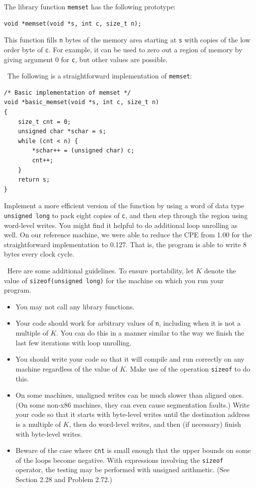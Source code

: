 \documentclass[12pt]{article}
\newenvironment{ex}[2][Exercise]{\begin{trivlist}
		\item[\hskip \labelsep {\bfseries #1}\hskip \labelsep {\bfseries #2.}]}{\end{trivlist}}
\begin{document}
\begin{ex}{5.17}
	The library function \texttt{memset} has the following prototype:
	\begin{lstlisting}
void *memset(void *s, int c, size_t n);
	\end{lstlisting}
	This function fills \texttt{n} bytes of the memory area starting at \texttt{s} with
	copies of the low order byte of \texttt{c}. For example, it can be used to zero out
	a region of memory by giving argument 0 for \texttt{c}, but other values are possible.
	
	\
	The following is a straightforward implementation of \texttt{memset}:
	\begin{lstlisting}
/* Basic implementation of memset */
void *basic_memset(void *s, int c, size_t n)
{
	size_t cnt = 0;
	unsigned char *schar = s;
	while (cnt < n) {
		*schar++ = (unsigned char) c;
		cnt++;
	}
	return s;
}
	\end{lstlisting}
	Implement a more efficient version of the function by using a word of data type
	\texttt{unsigned long} to pack eight copies of \texttt{c}, and then step through
	the region using word-level writes. You might find it helpful to do additional loop
	unrolling as well. On our reference machine, we were able to reduce the CPE from
	1.00 for the straightforward implementation to 0.127. That is, the program is able to
	write 8 bytes every clock cycle.
	
	\
	Here are some additional guidelines. To ensure portability, let $K$ denote the value
	of \texttt{sizeof(unsigned long)} for the machine on which you run your program.
	
	\begin{itemize}
		\item You may not call any library functions.
		\item Your code should work for arbitrary values of \texttt{n}, including when it is
		not a multiple of $K$. You can do this in a manner similar to the way we finish the
		last few iterations with loop unrolling.
		\item You should write your code so that it will compile and run correctly on any
		machine regardless of the value of $K$. Make use of the operation \texttt{sizeof}
		to do this.
		\item On some machines, unaligned writes can be much slower than aligned ones. (On
		some non-x86 machines, they can even cause segmentation faults.) Write your code so
		that it starts with byte-level writes until the destination address is a multiple
		of $K$, then do word-level writes, and then (if necessary) finish with byte-level
		writes.
		\item Beware of the case where \texttt{cnt} is small enough that the upper bounds on
		some of the loops become negative. With expressions involving the \texttt{sizeof}
		operator, the testing may be performed with unsigned arithmetic. (See Section 2.28
		and Problem 2.72.)
	\end{itemize}
\end{ex}
\end{document}
